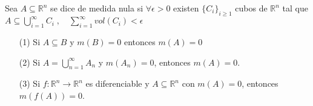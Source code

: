 \documentclass[../VD.tex]{subfiles}
\begin{document}
\begin{definition}\label{def:med-nula}
	Sea $A\subseteq \mathbb{R}^n$ se dice de medida nula si $\forall \epsilon>0$ existen $\{C_i\}_{i\geq 1}$ cubos de $\mathbb{R}^n$ tal que $A\subseteq \bigcup_{i=1}^\infty C_i\;,\quad \sum_{i=1}^{\infty}vol(C_i)<\epsilon$
\end{definition}

\begin{lemma}\label{lem:prop-med}
	\begin{enumerate}
		\item [(1)] Si $A\subseteq B$ y $m(B)=0$ entonces $m(A)=0$
		\item [(2)] Si $A=\bigcup_{n=1}^\infty A_n$ y $m(A_n)=0$, entonces $m(A)=0$.
		\item [(3)] Si  $f\colon\mathbb{R}^n\to \mathbb{R}^n$ es diferenciable y $A\subseteq\mathbb{R}^n$ con $m(A)=0$, entonces $m(f(A))=0$.
	\end{enumerate}
\end{lemma}
\end{document}
